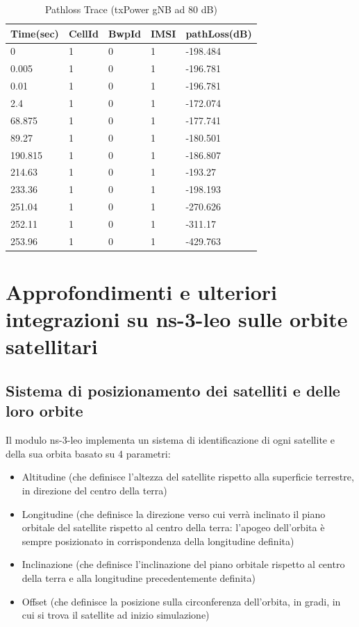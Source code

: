 \documentclass[12pt,a4paper]{article}
\providecommand{\tightlist}{%
  \setlength{\itemsep}{0pt}\setlength{\parskip}{0pt}}
\begin{document}
\begin{table}[!ht]
    \centering
    \begin{tabular}{|l|l|l|l|l|}
    \hline
        Time(sec) & CellId & BwpId & IMSI & pathLoss(dB) \\ \hline
        0 & 1 & 0 & 1 & -198.484 \\ \hline
        0.005 & 1 & 0 & 1 & -196.781 \\ \hline
        0.01 & 1 & 0 & 1 & -196.781 \\ \hline
        2.4 & 1 & 0 & 1 & -172.074 \\ \hline
        68.875 & 1 & 0 & 1 & -177.741 \\ \hline
        89.27 & 1 & 0 & 1 & -180.501 \\ \hline
        190.815 & 1 & 0 & 1 & -186.807 \\ \hline
        214.63 & 1 & 0 & 1 & -193.27 \\ \hline
        233.36 & 1 & 0 & 1 & -198.193 \\ \hline
        251.04 & 1 & 0 & 1 & -270.626 \\ \hline
        252.11 & 1 & 0 & 1 & -311.17 \\ \hline
        253.96 & 1 & 0 & 1 & -429.763 \\ \hline
    \end{tabular}
    \caption{Pathloss Trace (txPower gNB ad 80 dB)}
\end{table}

\section{Approfondimenti e ulteriori integrazioni su ns-3-leo sulle orbite satellitari}\label{approfondimenti-e-ulteriori-integrazioni-su-ns-3-leo-sulle-orbite-satellitari}

\subsection{Sistema di posizionamento dei satelliti e delle loro orbite}

Il modulo ns-3-leo implementa un sistema di identificazione di ogni satellite e della sua orbita basato su 4 parametri:

\begin{itemize}
\tightlist
\item
  Altitudine (che definisce l'altezza del satellite rispetto alla superficie terrestre, in direzione del centro della terra)
\item
  Longitudine (che definisce la direzione verso cui verrà inclinato il piano orbitale del satellite rispetto al centro della terra: l'apogeo dell'orbita è sempre posizionato in corrispondenza della longitudine definita)
\item
  Inclinazione (che definisce l'inclinazione del piano orbitale rispetto al centro della terra e alla longitudine precedentemente definita)
\item
  Offset (che definisce la posizione sulla circonferenza dell'orbita, in gradi, in cui si trova il satellite ad inizio simulazione)
\end{itemize}
\end{document}
